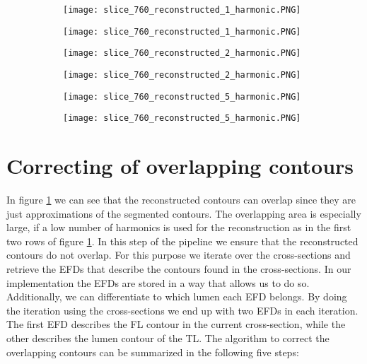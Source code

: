 \documentclass[thesis.tex]{subfiles}
\begin{document}
\begin{figure}
	\begin{subfigure}[t]{0.45\textwidth}
		\texttt{[image: slice\_760\_reconstructed\_1\_harmonic.PNG]}
	\caption{}		
	\end{subfigure}
\hspace{0.1\textwidth}
	\begin{subfigure}[t]{0.45\textwidth}
		\texttt{[image: slice\_760\_reconstructed\_1\_harmonic.PNG]}		
\caption{}	
	\end{subfigure}
	\begin{subfigure}[t]{0.45\textwidth}
		\texttt{[image: slice\_760\_reconstructed\_2\_harmonic.PNG]}
	\caption{}		
	\end{subfigure}
\hspace{0.1\textwidth}
	\begin{subfigure}[t]{0.45\textwidth}
		\texttt{[image: slice\_760\_reconstructed\_2\_harmonic.PNG]}		
\caption{}	
	\end{subfigure}
	\begin{subfigure}[t]{0.45\textwidth}
		\texttt{[image: slice\_760\_reconstructed\_5\_harmonic.PNG]}
	\caption{}		
	\end{subfigure}
\hspace{0.1\textwidth}
	\begin{subfigure}[t]{0.45\textwidth}
		\texttt{[image: slice\_760\_reconstructed\_5\_harmonic.PNG]}		
\caption{}	
	\end{subfigure}
	\caption{}

\label{fig:efds_reconstruction}
\end{figure}

\section{Correcting of overlapping contours}
In figure \ref{fig:efds_reconstruction} we can see that the reconstructed contours can overlap since they are just approximations of the segmented contours. The overlapping area is especially large, if a low number of harmonics is used for the reconstruction as in the first two rows of figure \ref{fig:efds_reconstruction}. In this step of the pipeline we ensure that the reconstructed contours do not overlap. For this purpose we iterate over the cross-sections and retrieve the EFDs that describe the contours found in the cross-sections. In our implementation the EFDs are stored in a way that allows us to do so. Additionally, we can differentiate to which lumen each EFD belongs. By doing the iteration using the cross-sections we end up with two EFDs in each iteration. The first EFD describes the FL contour in the current cross-section, while the other describes the lumen contour of the TL. 
The algorithm to correct the overlapping contours can be summarized in the following five steps:
\end{document}

